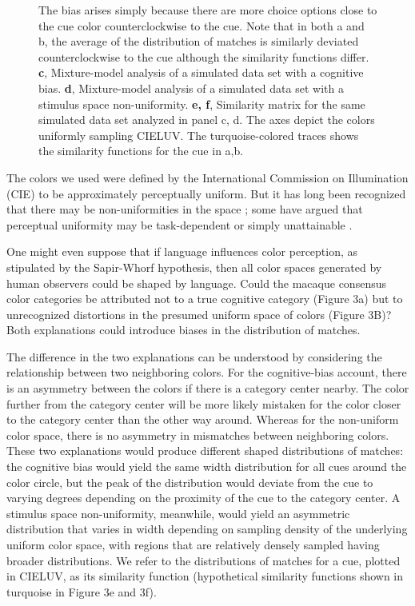 \begin{figure}
\begin{fullwidth}
{	The bias arises simply because there are more choice options close to the cue color counterclockwise to the cue. 
	Note that in both a and b, the average of the distribution of matches is similarly deviated counterclockwise to the cue although the similarity functions differ. 
	\textbf{c}, Mixture-model analysis of a simulated data set with a cognitive bias. 
	\textbf{d}, Mixture-model analysis of a simulated data set with a stimulus space non-uniformity. 
	\textbf{e, f}, Similarity matrix for the same simulated data set analyzed in panel c, d. The axes depict the colors uniformly sampling CIELUV. The turquoise-colored traces shows the similarity functions for the cue in a,b.}
    \label{fig:TCCDemo}
    \end{fullwidth}
\end{figure}

The colors we used were defined by the International Commission on Illumination (CIE) to be approximately perceptually uniform. 
But it has long been recognized that there may be non-uniformities in the space \citep{stockman_colorimetry_2010}; some have argued that perceptual uniformity may be task-dependent or simply unattainable \citep{judd_ideal_1969}.

One might even suppose that if language influences color perception, as stipulated by the Sapir-Whorf hypothesis, then all color spaces generated by human observers could be shaped by language. 
Could the macaque consensus color categories be attributed not to a true cognitive category (Figure 3a) but to unrecognized distortions in the presumed uniform space of colors (Figure 3B)?
Both explanations could introduce biases in the distribution of matches.

The difference in the two explanations can be understood by considering the relationship between two neighboring colors. 
For the cognitive-bias account, there is an asymmetry between the colors if there is a category center nearby.
The color further from the category center will be more likely mistaken for the color closer to the category center than the other way around. 
Whereas for the non-uniform color space, there is no asymmetry in mismatches between neighboring colors. 
These two explanations would produce different shaped distributions of matches: the cognitive bias would yield the same width distribution for all cues around the color circle, but the peak of the distribution would deviate from the cue to varying degrees depending on the proximity of the cue to the category center. 
A stimulus space non-uniformity, meanwhile, would yield an asymmetric distribution that varies in width depending on sampling density of the underlying uniform color space, with regions that are relatively densely sampled having broader distributions. 
We refer to the distributions of matches for a cue, plotted in CIELUV, as its similarity function (hypothetical similarity functions shown in turquoise in Figure 3e and 3f).

